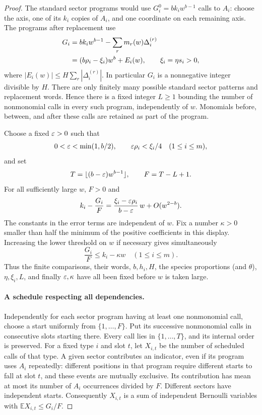 \begin{proof}
The standard sector programs would use
\(G_i^0=b k_iw^{b-1}\) calls to \(A_i\): choose the axis, one of its
\(k_i\) copies of \(A_i\), and one coordinate on each remaining axis.
The programs after replacement use
\begin{align}
 G_i
 &=b k_iw^{b-1}-\sum_rm_r(w)\Delta^{(r)}_i \notag\\
 &=(b\rho_i-\xi_i)w^b+E_i(w),
 \qquad \xi_i=\eta s_i>0,
 \label{price:total-load}
\end{align}
where
\( |E_i(w)|\leq H\sum_r|\Delta^{(r)}_i|\).
In particular \(G_i\) is a nonnegative integer divisible by \(H\).
There are only finitely many possible standard sector patterns and
replacement words.  Hence there is a fixed integer \(L\geq1\) bounding
the number of nonmonomial calls in every such program, independently of
\(w\).  Monomials before, between, and after these calls are retained as
part of the program.

Choose a fixed \(\varepsilon>0\) such that
\[
 0<\varepsilon<\min(1,b/2),\qquad
 \varepsilon\rho_i<\xi_i/4\quad(1\leq i\leq m),
\]
and set
\[
 T=\lfloor(b-\varepsilon)w^{b-1}\rfloor,
 \qquad F=T-L+1.
\]
For all sufficiently large \(w\), \(F>0\) and
\[
 k_i-\frac{G_i}{F}
 =\frac{\xi_i-\varepsilon\rho_i}{b-\varepsilon}\,w+O(w^{2-b}).
\]
The constants in the error terms are independent of \(w\).  Fix a
number \(\kappa>0\) smaller than half the minimum of the positive
coefficients in this display.  Increasing the lower threshold on \(w\)
if necessary gives simultaneously
\begin{equation}
 \frac{G_i}{F}\leq k_i-\kappa w
 \quad(1\leq i\leq m).
 \label{price:load-margin}
\end{equation}
Thus the finite comparisons, their words, \(b,h_i,H\), the species
proportions (and \(\theta\)), \(\eta,\xi_i,L\), and finally
\(\varepsilon,\kappa\) have all been fixed before \(w\) is taken large.

\paragraph{A schedule respecting all dependencies.}
Independently for each sector program having at least one nonmonomial
call, choose a start uniformly from \(\{1,\ldots,F\}\).  Put its
successive nonmonomial calls in consecutive slots starting there.
Every call lies in \(\{1,\ldots,T\}\), and its internal order is
preserved.  For a fixed type \(i\) and slot \(t\), let \(X_{i,t}\)
be the number of scheduled calls of that type.  A given sector contributes
an indicator, even if its program uses \(A_i\) repeatedly: different
positions in that program require different starts to fall at slot
\(t\), and these events are mutually exclusive.  Its contribution has
mean at most its number of \(A_i\) occurrences divided by \(F\).
Different sectors have independent starts.  Consequently \(X_{i,t}\)
is a sum of independent Bernoulli variables with
\(\mathbb E X_{i,t}\leq G_i/F\).


\end{proof}
